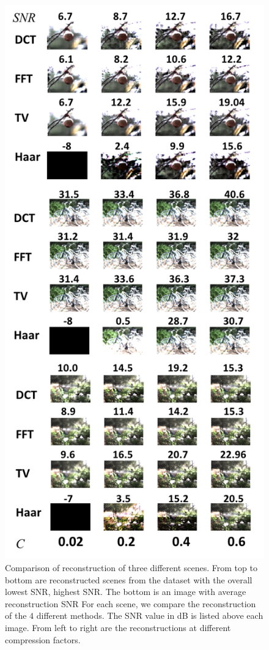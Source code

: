 \documentclass[10pt,twocolumn,letterpaper]{article}
\begin{document}
\begin{figure}[t]
\begin{center}
 \includegraphics[width=0.95\linewidth]{img/example_images.png}
\end{center}
   \caption{Comparison of reconstruction of three different scenes. From top to bottom are reconstructed scenes from the dataset with the overall lowest SNR, highest SNR. The bottom is an image with average reconstruction SNR For each scene, we compare the reconstruction of the $4$ different methods. The SNR value in dB is listed above each image. From left to right are the reconstructions at different compression factors.}
\end{figure}
\end{document}
